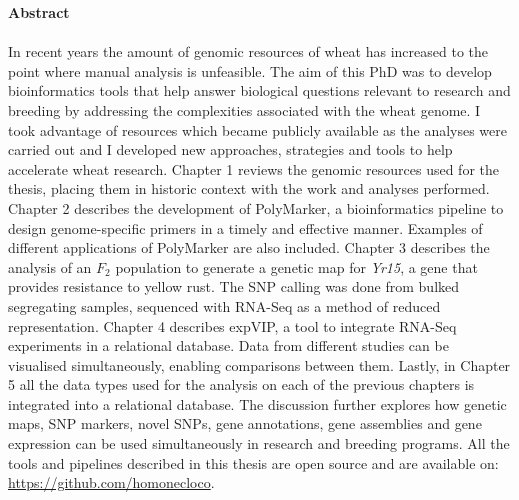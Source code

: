 
\addtocounter{page}{1}
\thispagestyle{empty}
\LARGE
\textbf{Abstract} 
\\
\normalsize
\\
In recent years the amount of genomic resources of wheat has increased to the point where manual analysis is unfeasible. 
The aim of this PhD was to develop bioinformatics tools that help answer biological questions relevant to research and breeding by addressing the complexities associated with the wheat genome. 
I took advantage of resources which became publicly available as the analyses were carried out and I developed new approaches, strategies and tools to help accelerate wheat research. 
Chapter 1 reviews the genomic resources used for the thesis, placing them in historic context with the work and analyses performed. 
Chapter 2 describes the development of PolyMarker, a bioinformatics pipeline to design genome-specific primers in a timely and effective manner. 
Examples of different applications of PolyMarker are also included. 
Chapter 3 describes the analysis of an $F_{2}$ population to generate a genetic map for \textit{Yr15}, a gene that provides resistance to yellow rust. 
The SNP calling was done from bulked segregating samples, sequenced with RNA-Seq as a method of reduced representation. 
Chapter 4 describes expVIP, a tool to integrate RNA-Seq experiments in a relational database.
Data from different studies can be visualised simultaneously, enabling comparisons between them. 
Lastly, in Chapter 5 all the data types used for the analysis on each of the previous chapters is integrated into a relational database. 
The discussion further explores how genetic maps, SNP markers, novel SNPs, gene annotations, gene assemblies and gene expression can be used simultaneously in research and breeding programs. 
All the tools and pipelines described in this thesis are open source and are available on: \url{https://github.com/homonecloco}. 




